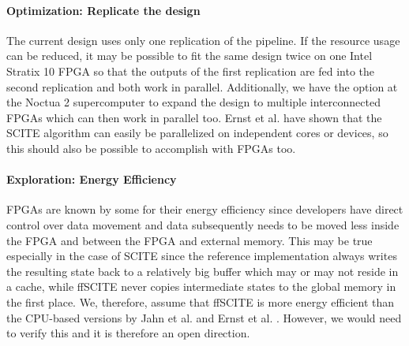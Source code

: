 \paragraph{Optimization: Replicate the design}
The current design uses only one replication of the pipeline. If the resource usage can be reduced, it may be possible to fit the same design twice on one Intel Stratix 10 \ac{FPGA} so that the outputs of the first replication are fed into the second replication and both work in parallel. Additionally, we have the option at the Noctua 2 supercomputer to expand the design to multiple interconnected \acp{FPGA} which can then work in parallel too. Ernst et al. \cite{ernst2020Performance} have shown that the \ac{SCITE} algorithm can easily be parallelized on independent cores or devices, so this should also be possible to accomplish with \acp{FPGA} too.

\paragraph{Exploration: Energy Efficiency}
\acp{FPGA} are known by some for their energy efficiency \cite{betkaoui2010comparing} since developers have direct control over data movement and data subsequently needs to be moved less inside the \ac{FPGA} and between the \ac{FPGA} and external memory. This may be true especially in the case of \ac{SCITE} since the reference implementation always writes the resulting state back to a relatively big buffer which may or may not reside in a cache, while \ac{ffSCITE} never copies intermediate states to the global memory in the first place. We, therefore, assume that \ac{ffSCITE} is more energy efficient than the CPU-based versions by Jahn et al. \cite{tree2016} and Ernst et al. \cite{ernst2020Performance}. However, we would need to verify this and it is therefore an open direction.